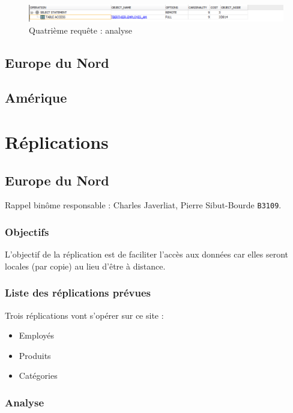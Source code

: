 \documentclass[10pt,a4paper]{article}
\theoremstyle{plain}
\begin{document}
\begin{figure}[!h]
    \centering
    \includegraphics[width=15cm]{EUS_req4_analyse.PNG}
    \caption{Quatrième requête : analyse}
\end{figure}
\newpage

\subsection{Europe du Nord}
%
\newpage

\subsection{Amérique}
%
\newpage

\section{Réplications}
\subsection{Europe du Nord}
Rappel binôme responsable : Charles Javerliat, Pierre Sibut-Bourde \verb|B3109|.
\subsubsection{Objectifs}
L’objectif de la réplication est de faciliter l’accès aux données car elles seront locales (par copie) au lieu d'être à distance.

\subsubsection{Liste des réplications prévues}
Trois réplications vont s'opérer sur ce site :
\begin{itemize}
    \item Employés
    \item Produits
    \item Catégories
\end{itemize}

\subsubsection{Analyse}
%
\end{document}
